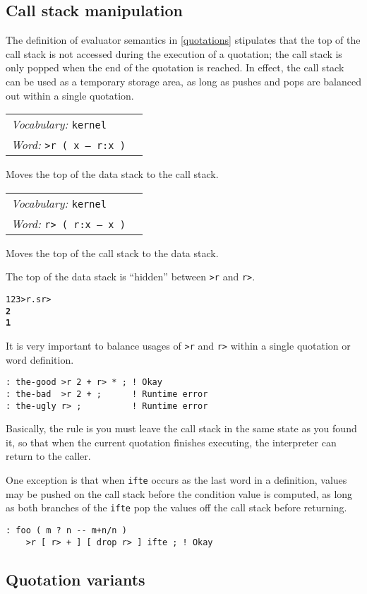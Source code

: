 \documentclass{book}
\newcommand{\vocabulary}[1]{\emph{Vocabulary:} \texttt{#1}&\\}
\newcommand{\ordinaryword}[2]{\index{\texttt{#1}}\emph{Word:} \texttt{#2}&\\}
\newcommand{\wordtable}[1]{


\begin{tabularx}{12cm}{lX}
\hline
#1
\hline
\end{tabularx}

}
\begin{document}
\subsection{Call stack manipulation}

The definition of evaluator semantics in \ref{quotations} stipulates that the top of the call stack is not accessed during the execution of a quotation; the call stack is only popped when the end of the quotation is reached. In effect, the call stack can be used as a temporary storage area, as long as pushes and pops are balanced out within a single quotation.
\wordtable{
\vocabulary{kernel}
\ordinaryword{>r}{>r ( x -- r:x )}
}
Moves the top of the data stack to the call stack.
\wordtable{
\vocabulary{kernel}
\ordinaryword{r>}{r> ( r:x -- x )}
}
Moves the top of the call stack to the data stack.

The top of the data stack is ``hidden'' between \texttt{>r} and \texttt{r>}.
\begin{alltt}
  1 2 3 >r .s r>
\textbf{2
1}
\end{alltt}
It is very important to balance usages of \texttt{>r} and \texttt{r>} within a single quotation or word definition.
\begin{verbatim}
: the-good >r 2 + r> * ; ! Okay
: the-bad  >r 2 + ;      ! Runtime error
: the-ugly r> ;          ! Runtime error
\end{verbatim}
Basically, the rule is you must leave the call stack in the same state as you found it, so that when the current quotation finishes executing, the interpreter can return to the caller.

One exception is that when \texttt{ifte} occurs as the last word in a definition, values may be pushed on the call stack before the condition value is computed, as long as both branches of the \texttt{ifte} pop the values off the call stack before returning.
\begin{verbatim}
: foo ( m ? n -- m+n/n )
    >r [ r> + ] [ drop r> ] ifte ; ! Okay
\end{verbatim}

\subsection{Quotation variants}
\end{document}
